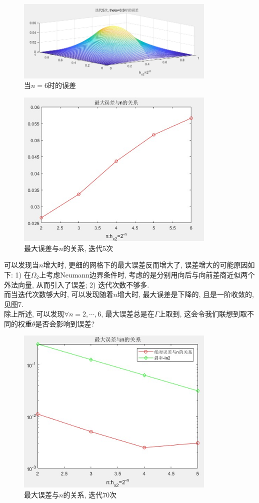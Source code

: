 \documentclass[12pt]{article}
\begin{document}
\begin{figure}[H]
	\centering
	\includegraphics[width=0.85\textwidth]{5}
	\caption{当$n=6$时的误差}
\end{figure}
\begin{figure}[H]
	\centering
	\includegraphics[width=0.85\textwidth]{6}
	\caption{最大误差与$n$的关系, 迭代5次}
\end{figure}
\noindent 可以发现当$n$增大时, 更细的网格下的最大误差反而增大了, 误差增大的可能原因如下: 1) 在$\Omega_2$上考虑Neumann边界条件时, 考虑的是分别用向后与向前差商近似两个外法向量, 从而引入了误差; 2) 迭代次数不够多.\\
而当迭代次数够大时, 可以发现随着$n$增大时, 最大误差是下降的, 且是一阶收敛的, 见图7.\\
除上所述, 可以发现$\forall n = 2,\cdots,6$, 最大误差总是在$\Gamma$上取到, 这会令我们联想到取不同的权重$\theta$是否会影响到误差?
\begin{figure}[H]
	\centering
	\includegraphics[width=0.85\textwidth]{7}
	\caption{最大误差与$n$的关系, 迭代70次}
\end{figure}
\end{document}
